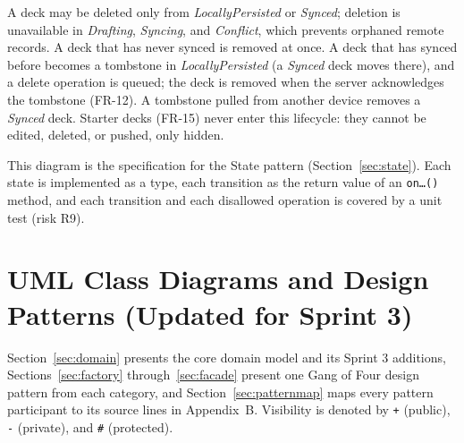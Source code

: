 \documentclass[12pt,letterpaper]{article}
\begin{document}
A deck may be deleted only from \emph{LocallyPersisted} or \emph{Synced}; deletion is
unavailable in \emph{Drafting}, \emph{Syncing}, and \emph{Conflict}, which prevents
orphaned remote records. A deck that has never synced is removed at once. A deck that
has synced before becomes a tombstone in \emph{LocallyPersisted} (a \emph{Synced} deck
moves there), and a delete operation is queued; the deck is removed when the server
acknowledges the tombstone (FR-12). A tombstone pulled from another device removes a
\emph{Synced} deck. Starter decks (FR-15) never enter this lifecycle: they cannot be
edited, deleted, or pushed, only hidden.

This diagram is the specification for the State pattern (Section~\ref{sec:state}).
Each state is implemented as a type, each transition as the return value of an
\texttt{on\ldots()} method, and each transition and each disallowed operation is
covered by a unit test (risk R9).

\section{UML Class Diagrams and Design Patterns (Updated for Sprint 3)}
Section~\ref{sec:domain} presents the core domain model and its Sprint 3 additions,
Sections~\ref{sec:factory} through~\ref{sec:facade} present one Gang of Four design
pattern from each category, and Section~\ref{sec:patternmap} maps every pattern
participant to its source lines in Appendix~B. Visibility is denoted by \texttt{+} (public), \texttt{-}
(private), and \texttt{\#} (protected).
\end{document}
